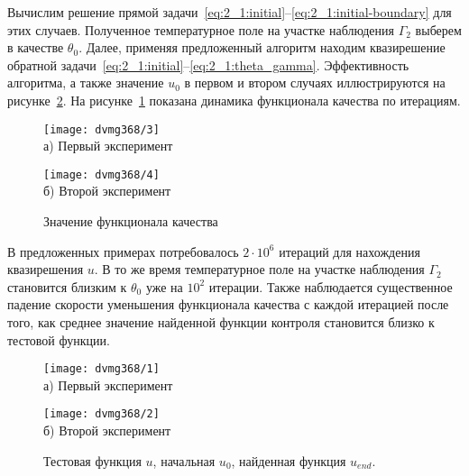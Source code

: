 Вычислим решение прямой
задачи~\eqref{eq:2_1:initial}--\eqref{eq:2_1:initial-boundary}
для этих случаев.
Полученное температурное поле на участке наблюдения
$\Gamma_2$ выберем в качестве $\theta_0$.
Далее, применяя предложенный алгоритм находим квазирешение обратной
задачи~\eqref{eq:2_1:initial}--\eqref{eq:2_1:theta_gamma}.
Эффективность алгоритма, а также значение $u_0$ в первом и
втором случаях иллюстрируются на рисунке~\ref{fig:4_3:control}.
На рисунке~\ref{fig:4_3:cost} показана динамика функционала качества по итерациям.
\begin{figure}[h!t]
    \begin{minipage}[b][][b]{0.49\linewidth}
        \centering
        \texttt{[image: dvmg368/3]} \\ а) Первый эксперимент
    \end{minipage}
    \hfill
    \begin{minipage}[b][][b]{0.49\linewidth}
        \centering
        \texttt{[image: dvmg368/4]} \\ б) Второй эксперимент
    \end{minipage}
    \caption{Значение функционала качества}
    \label{fig:4_3:cost}
\end{figure}

\begin{remark}
    В предложенных примерах потребовалось
    $2 \cdot 10^6$ итераций для нахождения квазирешения $u$.
    В то же время температурное поле на участке наблюдения
    $\Gamma_2$ становится близким к $\theta_0$ уже на $10^2$ итерации.
    Также наблюдается существенное падение скорости уменьшения функционала
    качества с каждой итерацией после того, как среднее значение найденной
    функции контроля становится близко к тестовой функции.
\end{remark}

\begin{figure}[h!t]
    \begin{minipage}[b][][b]{0.49\linewidth}
        \centering
        \texttt{[image: dvmg368/1]} \\ а) Первый эксперимент
    \end{minipage}
    \hfill
    \begin{minipage}[b][][b]{0.49\linewidth}
        \centering
        \texttt{[image: dvmg368/2]} \\ б) Второй эксперимент
    \end{minipage}
    \caption{Тестовая функция $u$, начальная $u_0$, найденная функция $u_{end}.$}
    \label{fig:4_3:control}
\end{figure}

